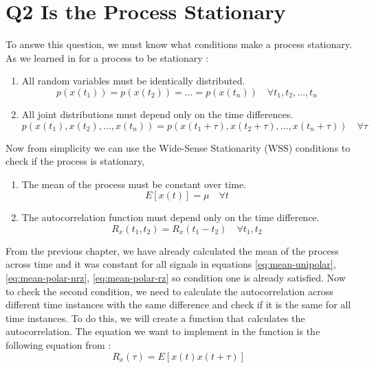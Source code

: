 \chapter[Q2 Is the Process Stationary]{Q2 Is the Process Stationary}
\label{cp:q2-is-the-process-stationary}

To answe this question, we must know what conditions make a process stationary.
As we learned in \cite{Nafie2026} for a process to be stationary :
\begin{enumerate}
    \item All random variables must be identically distributed. \begin{equation}
              p(x(t_1)) = p(x(t_2)) = \ldots = p(x(t_n)) \quad \forall t_1, t_2, \ldots, t_n
          \end{equation}
    \item All joint distributions must depend only on the time differences. \begin{equation}
              p(x(t_1), x(t_2), \ldots, x(t_n)) = p(x(t_1 + \tau), x(t_2 + \tau), \ldots, x(t_n + \tau)) \quad \forall \tau
          \end{equation}
\end{enumerate}

Now from simplicity we can use the Wide-Sense Stationarity (WSS) conditions to
check if the process is stationary,
\begin{enumerate}
    \item The mean of the process must be constant over time. \begin{equation}
              E[x(t)] = \mu \quad \forall t
          \end{equation}
    \item The autocorrelation function must depend only on the time difference. \begin{equation}
              R_x(t_1, t_2) = R_x(t_1 - t_2) \quad \forall t_1, t_2
          \end{equation}
\end{enumerate}

From the previous chapter, we have already calculated the mean of the process
across time and it was constant for all signals in equations
\ref{eq:mean-unipolar}, \ref{eq:mean-polar-nrz}, \ref{eq:mean-polar-rz} so
condition one is already satisfied. Now to check the second condition, we need
to calculate the autocorrelation across different time instances with the same
difference and check if it is the same for all time instances. To do this, we
will create a function that calculates the autocorrelation. The equation we
want to implement in the function is the following equation from
\cite{Nafie2026}:
\begin{equation}
    R_x(\tau) = E[x(t) x(t + \tau)]
    \label{eq:autocorrelation-calculation}
\end{equation}

